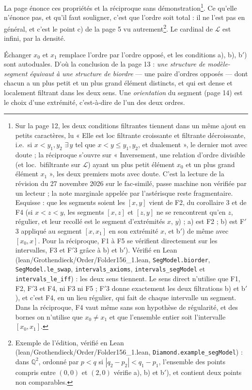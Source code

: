 \documentclass[11pt,a4paper]{article}
\begin{document}
La page énonce ces propriétés et la réciproque sans
démonstration\footnote{Sur la page 12, les deux conditions filtrantes
tiennent dans un même ajout en petits caractères, lu « Elle est loc filtrante
croissante et filtrante décroissante, i.e.\ si $x < y_{1}, y_{2}$ $\exists\, y$
tel que $x < y \leq y_{1}, y_{2}$, et dualement », le dernier mot avec doute ;
la réciproque s'ouvre sur « Inversement, une relation d'ordre divisible (et
loc.\ bifiltrante sur $\mathcal{L}$) ayant un plus petit élément $x_{0}$ et un
plus grand élément $x_{1}$ », les deux premiers mots avec doute. C'est la
lecture de la révision du 27 novembre 2026 sur le fac-similé, passe machine
non vérifiée par un lecteur ; la note marginale appelée par l'astérisque reste
fragmentaire. Esquisse : que les segments soient les $[x,y]$ vient de
F2, du corollaire 3 et de F4 (si $x < z < y$, les segments $[x,z]$ et $[z,y]$
ne se rencontrent qu'en $z$, régulier, et leur recollé est le segment
d'extrémités $x$, $y$) ; a) est F2 ; b) est F$'$3 appliqué au segment
$[x,x_{1}]$ en son extrémité $x$, et b$'$) de même avec $[x_{0},x]$. Pour la réciproque, F1 à
F5 se vérifient directement sur les intervalles, F3 et F$'$3 grâce à b) et
b$'$). Vérifié en Lean (lean/Grothendieck/Order/Folder156\_1.lean,
\texttt{SegModel.biorder}, \texttt{SegModel.le\_swap},
\texttt{intervals\_axioms}, \texttt{intervals\_segModel} et
\texttt{intervals\_le\_iff}) : les deux sens tiennent. Le sens direct
n'utilise que F1, F2, F$'$3 et F4, ni F3 ni F5 ; F$'$3 donne exactement les
deux filtrations b) et b$'$), et c'est F4, en un lieu régulier, qui fait de
chaque intervalle un segment. Dans la réciproque, F4 vaut même sans son
hypothèse de régularité, et des bornes on n'utilise que $x_{0} \neq x_{1}$ et
que l'ensemble entier soit l'intervalle $[x_{0}, x_{1}]$.}. Ce qu'elle n'énonce pas, et qu'il faut souligner, c'est que l'ordre
soit total : il ne l'est pas en général, et c'est le point c) de la page 5 vu
autrement\footnote{Exemple de l'édition, vérifié en Lean
(lean/Grothendieck/Order/Folder156\_1.lean, \texttt{Diamond.example\_segModel}) :
dans $\mathbb{Q}^{2}$, ordonné par $p < q$ si $|q_{2} - p_{2}| < q_{1} - p_{1}$,
l'ensemble des points compris entre $(0,0)$ et $(2,0)$ vérifie a), b) et b$'$),
et contient deux points non comparables.}. Le cardinal de $\mathcal{L}$ est infini, par la densité.

Échanger $x_{0}$ et $x_{1}$ remplace l'ordre par l'ordre opposé, et les
conditions a), b), b$'$) sont autoduales. D'où la conclusion de la page 13 :
\emph{une structure de modèle-segment équivaut à une structure de biordre} ---
une paire d'ordres opposés --- dont chacun a un plus petit et un plus grand
élément distincts, et qui est dense et localement filtrant dans les deux sens.
Une \emph{orientation} du segment (page 14) est le choix d'une extrémité,
c'est-à-dire de l'un des deux ordres.
\end{document}
